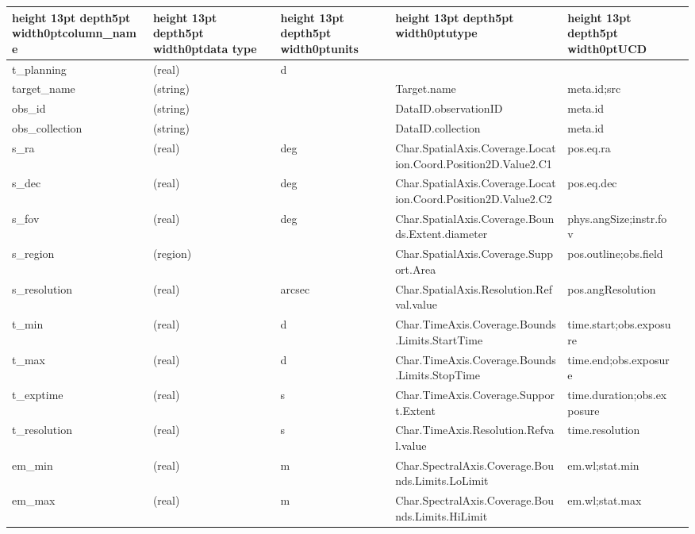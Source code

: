 \documentclass[11pt,a4paper]{ivoa}
\begin{document}
\begin{landscape}
\begin{table}
\def\hlstrut{\vrule height 13pt depth5pt width0pt}
\begin{tabular}{ |l|l|l|l|l|l| }
\hline
\hlstrut\textbf{column\_name} &
\hlstrut\textbf{data type} &
\hlstrut\textbf{units} &
\hlstrut\textbf{utype} &
\hlstrut\textbf{UCD} \\
\hline
t\_planning &
(real) &
d &
&
\\
\hline
target\_name &
(string) &
&
Target.name &
meta.id;src \\
\hline
obs\_id &
(string) &
&
DataID.observationID &
meta.id \\
\hline
obs\_collection &
(string) &
&
DataID.collection &
meta.id \\
\hline
s\_ra &
(real) &
deg &
Char.SpatialAxis.Coverage.Location.Coord.Position2D.Value2.C1 &
pos.eq.ra \\
\hline
s\_dec &
(real) &
deg &
Char.SpatialAxis.Coverage.Location.Coord.Position2D.Value2.C2 &
pos.eq.dec \\
\hline
s\_fov &
(real) &
deg &
Char.SpatialAxis.Coverage.Bounds.Extent.diameter &
phys.angSize;instr.fov \\
\hline
s\_region &
(region) &
&
Char.SpatialAxis.Coverage.Support.Area &
pos.outline;obs.field \\
\hline
s\_resolution &
(real) &
arcsec &
Char.SpatialAxis.Resolution.Refval.value &
pos.angResolution \\
\hline
t\_min &
(real) &
d &
Char.TimeAxis.Coverage.Bounds.Limits.StartTime &
time.start;obs.exposure \\
\hline
t\_max &
(real) &
d &
Char.TimeAxis.Coverage.Bounds.Limits.StopTime &
time.end;obs.exposure \\
\hline
t\_exptime &
(real) &
s &
Char.TimeAxis.Coverage.Support.Extent &
time.duration;obs.exposure \\
\hline
t\_resolution &
(real) &
s &
Char.TimeAxis.Resolution.Refval.value &
time.resolution \\
\hline
em\_min &
(real) &
m &
Char.SpectralAxis.Coverage.Bounds.Limits.LoLimit &
em.wl;stat.min \\
\hline
em\_max &
(real) &
m &
Char.SpectralAxis.Coverage.Bounds.Limits.HiLimit &
em.wl;stat.max \\

\end{tabular}
\end{table}
\end{landscape}
\end{document}
